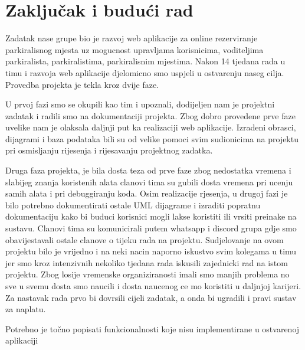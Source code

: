 \chapter{Zaključak i budući rad}
		
		Zadatak nase grupe bio je razvoj web aplikacije za online rezerviranje parkiralisnog mjesta uz mogucnost upravljama korisnicima, voditeljima parkiralista, parkiralistima, parkiralisnim mjestima.
	Nakon 14 tjedana rada u timu i razvoja web aplikacije djelomicno smo uspjeli u ostvarenju naseg cilja. Provedba projekta je tekla kroz dvije faze.
	
	U prvoj fazi smo se okupili kao tim i upoznali, dodijeljen nam je projektni zadatak i radili smo na dokumentaciji projekta.	Zbog dobro provedene prve faze uvelike nam je olaksala daljnji put ka realizaciji web aplikacije.	Izradeni obrasci, dijagrami i baza podataka bili su od velike pomoci svim sudionicima na projektu pri osmisljanju rijesenja i rijesavanju projektnog zadatka.
	
		Druga faza projekta, je bila dosta teza od prve faze zbog nedostatka vremena i slabijeg znanja koristenih alata clanovi tima su gubili dosta vremena pri ucenju samih alata i pri debuggiranju koda. Osim realizacije rjesenja,
		u drugoj fazi je bilo potrebno dokumentirati ostale UML dijagrame i izraditi popratnu dokumentaciju kako bi buduci korisnici mogli lakse koristiti ili vrsiti preinake na sustavu. Clanovi tima su komunicirali putem whatsapp i discord grupa gdje smo obavijestavali ostale clanove o tijeku rada na projektu.
		Sudjelovanje na ovom projektu bilo je vrijedno i na neki nacin naporno iskustvo svim kolegama u timu jer smo kroz intenzivnih nekoliko tjedana rada iskusili zajednicki rad na istom projektu. Zbog losije vremenske organiziranosti imali smo manjih problema no sve u svemu dosta smo naucili i dosta naucenog ce mo koristiti u daljnjoj karijeri.
		Za nastavak rada prvo bi dovrsili cijeli zadatak, a onda bi ugradili i pravi sustav za naplatu.
		
		Potrebno je točno popisati funkcionalnosti koje nisu implementirane u ostvarenoj aplikaciji
		
		\eject 